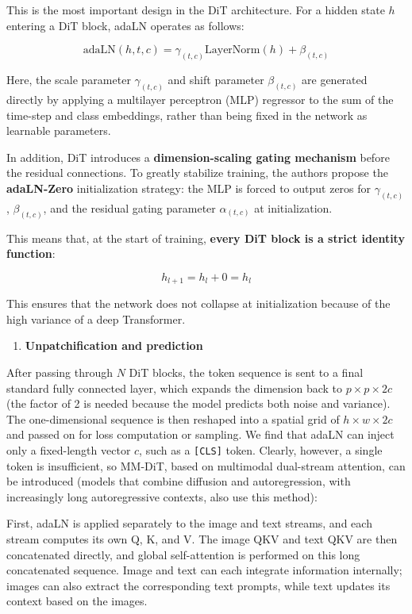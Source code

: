 This is the most important design in the DiT architecture. For a hidden state \(h\) entering a DiT block, adaLN operates as follows:

\[
\mathrm{adaLN}(h,t,c)=\gamma_{(t,c)}\mathrm{LayerNorm}(h)+\beta_{(t,c)}
\]

Here, the scale parameter \(\gamma_{(t,c)}\) and shift parameter \(\beta_{(t,c)}\) are generated directly by applying a multilayer perceptron (MLP) regressor to the sum of the time-step and class embeddings, rather than being fixed in the network as learnable parameters.

In addition, DiT introduces a \textbf{dimension-scaling gating mechanism} before the residual connections. To greatly stabilize training, the authors propose the \textbf{adaLN-Zero} initialization strategy: the MLP is forced to output zeros for \(\gamma_{(t,c)}\), \(\beta_{(t,c)}\), and the residual gating parameter \(\alpha_{(t,c)}\) at initialization.

This means that, at the start of training, \textbf{every DiT block is a strict identity function}:

\[
h_{l+1}=h_l+0=h_l
\]

This ensures that the network does not collapse at initialization because of the high variance of a deep Transformer.

\begin{enumerate}
\def\labelenumi{\arabic{enumi}.}
\setcounter{enumi}{2}
\tightlist
\item
  \textbf{Unpatchification and prediction}
\end{enumerate}

After passing through \(N\) DiT blocks, the token sequence is sent to a final standard fully connected layer, which expands the dimension back to \(p\times p\times 2c\) (the factor of 2 is needed because the model predicts both noise and variance). The one-dimensional sequence is then reshaped into a spatial grid of \(h\times w\times 2c\) and passed on for loss computation or sampling.
We find that adaLN can inject only a fixed-length vector \(c\), such as a \texttt{{[}CLS{]}} token. Clearly, however, a single token is insufficient, so MM-DiT, based on multimodal dual-stream attention, can be introduced (models that combine diffusion and autoregression, with increasingly long autoregressive contexts, also use this method):

First, adaLN is applied separately to the image and text streams, and each stream computes its own Q, K, and V. The image QKV and text QKV are then concatenated directly, and global self-attention is performed on this long concatenated sequence. Image and text can each integrate information internally; images can also extract the corresponding text prompts, while text updates its context based on the images.

